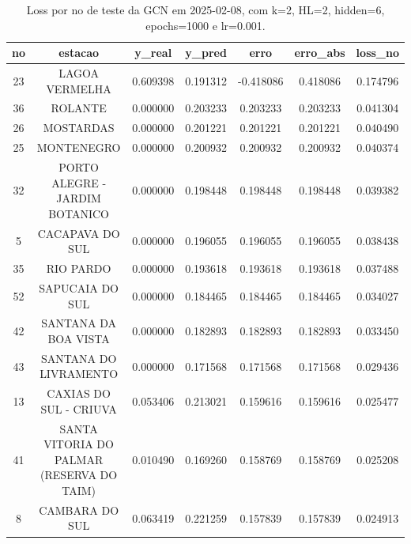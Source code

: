 \begin{table}[h]
\centering
\caption{Loss por no de teste da GCN em 2025-02-08, com k=2, HL=2, hidden=6, epochs=1000 e lr=0.001.}
\label{tab:gcn_loss_k2_hl2_h6_e1000_d20250208}
\begin{tabular}{ccccccc}
\toprule
no & estacao & y\_real & y\_pred & erro & erro\_abs & loss\_no \\
\midrule
23 & LAGOA VERMELHA & 0.609398 & 0.191312 & -0.418086 & 0.418086 & 0.174796 \\
36 & ROLANTE & 0.000000 & 0.203233 & 0.203233 & 0.203233 & 0.041304 \\
26 & MOSTARDAS & 0.000000 & 0.201221 & 0.201221 & 0.201221 & 0.040490 \\
25 & MONTENEGRO & 0.000000 & 0.200932 & 0.200932 & 0.200932 & 0.040374 \\
32 & PORTO ALEGRE - JARDIM BOTANICO & 0.000000 & 0.198448 & 0.198448 & 0.198448 & 0.039382 \\
5 & CACAPAVA DO SUL & 0.000000 & 0.196055 & 0.196055 & 0.196055 & 0.038438 \\
35 & RIO PARDO & 0.000000 & 0.193618 & 0.193618 & 0.193618 & 0.037488 \\
52 & SAPUCAIA DO SUL & 0.000000 & 0.184465 & 0.184465 & 0.184465 & 0.034027 \\
42 & SANTANA DA BOA VISTA & 0.000000 & 0.182893 & 0.182893 & 0.182893 & 0.033450 \\
43 & SANTANA DO LIVRAMENTO & 0.000000 & 0.171568 & 0.171568 & 0.171568 & 0.029436 \\
13 & CAXIAS DO SUL - CRIUVA & 0.053406 & 0.213021 & 0.159616 & 0.159616 & 0.025477 \\
41 & SANTA VITORIA DO PALMAR (RESERVA DO TAIM) & 0.010490 & 0.169260 & 0.158769 & 0.158769 & 0.025208 \\
8 & CAMBARA DO SUL & 0.063419 & 0.221259 & 0.157839 & 0.157839 & 0.024913 \\
\bottomrule
\end{tabular}
\end{table}
